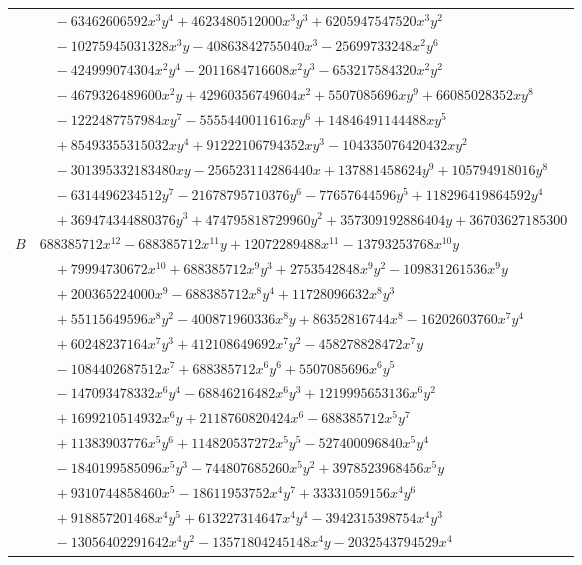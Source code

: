 \documentclass[11pt]{article}
\begin{document}
\begin{longtable}{@{}ll@{}}
 & $\quad -63462606592x^{3}y^{4}+4623480512000x^{3}y^{3}+6205947547520x^{3}y^{2}$\\
 & $\quad -10275945031328x^{3}y-40863842755040x^{3}-25699733248x^{2}y^{6}$\\
 & $\quad -424999074304x^{2}y^{4}-2011684716608x^{2}y^{3}-653217584320x^{2}y^{2}$\\
 & $\quad -4679326489600x^{2}y+42960356749604x^{2}+5507085696xy^{9}+66085028352xy^{8}$\\
 & $\quad -1222487757984xy^{7}-5555440011616xy^{6}+14846491144488xy^{5}$\\
 & $\quad +85493355315032xy^{4}+91222106794352xy^{3}-104335076420432xy^{2}$\\
 & $\quad -301395332183480xy-256523114286440x+137881458624y^{9}+105794918016y^{8}$\\
 & $\quad -6314496234512y^{7}-21678795710376y^{6}-77657644596y^{5}+118296419864592y^{4}$\\
 & $\quad +369474344880376y^{3}+474795818729960y^{2}+357309192886404y+36703627185300$\\
$B$ & $688385712x^{12}-688385712x^{11}y+12072289488x^{11}-13793253768x^{10}y$\\
 & $\quad +79994730672x^{10}+688385712x^{9}y^{3}+2753542848x^{9}y^{2}-109831261536x^{9}y$\\
 & $\quad +200365224000x^{9}-688385712x^{8}y^{4}+11728096632x^{8}y^{3}$\\
 & $\quad +55115649596x^{8}y^{2}-400871960336x^{8}y+86352816744x^{8}-16202603760x^{7}y^{4}$\\
 & $\quad +60248237164x^{7}y^{3}+412108649692x^{7}y^{2}-458278828472x^{7}y$\\
 & $\quad -1084402687512x^{7}+688385712x^{6}y^{6}+5507085696x^{6}y^{5}$\\
 & $\quad -147093478332x^{6}y^{4}-68846216482x^{6}y^{3}+1219995653136x^{6}y^{2}$\\
 & $\quad +1699210514932x^{6}y+2118760820424x^{6}-688385712x^{5}y^{7}$\\
 & $\quad +11383903776x^{5}y^{6}+114820537272x^{5}y^{5}-527400096840x^{5}y^{4}$\\
 & $\quad -1840199585096x^{5}y^{3}-744807685260x^{5}y^{2}+3978523968456x^{5}y$\\
 & $\quad +9310744858460x^{5}-18611953752x^{4}y^{7}+33331059156x^{4}y^{6}$\\
 & $\quad +918857201468x^{4}y^{5}+613227314647x^{4}y^{4}-3942315398754x^{4}y^{3}$\\
 & $\quad -13056402291642x^{4}y^{2}-13571804245148x^{4}y-2032543794529x^{4}$\\

\end{longtable}
\end{document}
